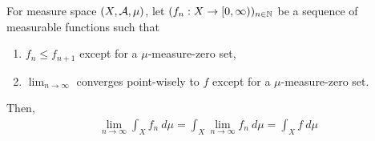 \documentclass[11pt]{article}
\begin{document}
	\begin{theorem}
		For measure space $(X, \mathcal{{A}}, \mu)$, let $(f_n: X \to [0,\infty))_{n \in \mathbb{N}}$ be a sequence of measurable functions such that
		\begin{enumerate}
			\item $f_{n} \leq f_{n+1}$ except for a $\mu$-measure-zero set,
			\item $\lim_{n\to\infty}$ converges point-wisely to $f$ except for a $\mu$-measure-zero set.
		\end{enumerate}
		Then,
		\begin{align}
			\lim_{n \to \infty} \int_X f_n\ d\mu = \int_X \lim_{n \to \infty} f_n\ d\mu = \int_X f\ d\mu
		\end{align}
	\end{theorem}
	
\end{document}
